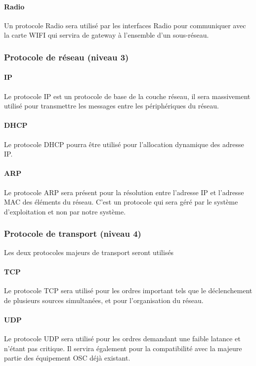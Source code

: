 \paragraph{Radio}\rt Un protocole Radio sera utilisé par les interfaces Radio pour communiquer avec la carte WIFI qui servira de gateway à l'ensemble d'un sous-réseau.

\subsubsection{Protocole de réseau (niveau 3)}
\paragraph{IP}\rt Le protocole IP est un protocole de base de la couche réseau, il sera massivement utilisé pour transmettre les messages entre les périphériques du réseau.
\paragraph{DHCP}\rt Le protocole DHCP pourra être utilisé pour l'allocation dynamique des adresse IP.
\paragraph{ARP}\rt Le protocole ARP sera présent pour la résolution entre l'adresse IP et l'adresse MAC des éléments du réseau. C'est un protocole qui sera géré par le système d'exploitation et non par notre système.

\subsubsection{Protocole de transport (niveau 4)}
Les deux protocoles majeurs de transport seront utilisés
\paragraph{TCP}\rt Le protocole TCP sera utilisé pour les ordres important tels que le déclenchement de plusieurs sources simultanées, et pour l'organisation du réseau.
\paragraph{UDP}\rt Le protocole UDP sera utilisé pour les ordres demandant une faible latance et n'étant pas critique. Il servira également pour la compatibilité avec la majeure partie des équipement OSC déjà existant.

